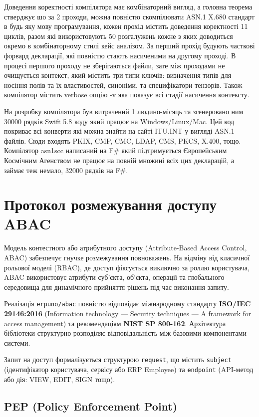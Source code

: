 Доведення коректності компілятора має комбінаторний вигляд, а головна теорема стверджує шо за 2 проходи, можна повністю скомпілювати ASN.1 X.680 стандарт в будь яку мову програмування, кожен прохід містить доведення коректності 11 циклів, разом які використовують 50 розгалужень кожне з яких доводиться окремо в комбінаторному стилі кейс аналізом. За перший прохід будують часткові форвард декларації, які повністю стають насиченими на другому проході. В процесі першого проходу не зберігаються файли, зате між проходами не очищується контекст, який містить три типи ключів: визначення типів для носіння полів та їх властивостей, синоніми, та специфікатори тензорів. Також компілятор містить verbose опцію -v яка показує всі стадії насичення контексту.

На розробку компілятора був витрачений 1 людино-місяць та згенеровано ним 30000 рядків Swift 5.8 коду який працює на Windows/Linux/Mac. Цей код покриває всі конверти які можна знайти на сайті ITU.INT у вигляді ASN.1 файлів. Сюди входять PKIX, CMP, CMC, LDAP, CMS, PKCS, X.400, тощо. Компілятор asn1scc написаний на F# який підтримується Європейським Космічним Агенством не працює на повній множині всіх цих декларацій, а займає теж немало, 32000 рядків на F#.


\section{Протокол розмежування доступу ABAC}

Модель контестного або атрибутного доступу (Attribute-Based Access Control, ABAC) забезпечує гнучке розмежування повноважень. На відміну від класичної рольової моделі (RBAC), де доступ фіксується виключно за роллю користувача, ABAC використовує атрибути суб'єкта, об'єкта, операції та глобального середовища для динамічного прийняття рішень під час виконання запиту. 

Реалізація \texttt{erpuno/abac} повністю відповідає міжнародному стандарту \textbf{ISO/IEC 29146:2016} (Information technology — Security techniques — A framework for access management) та рекомендаціям \textbf{NIST SP 800-162}. Архітектура бібліотеки структурно розподіляє відповідальність між базовими компонентами системи.

Запит на доступ формалізується структурою \texttt{request}, що містить \texttt{subject} (ідентифікатор користувача, сервісу або ERP Employee) та \texttt{endpoint} (API-метод або дія: VIEW, EDIT, SIGN тощо).

\subsection{PEP (Policy Enforcement Point)}

